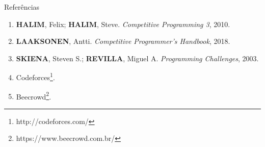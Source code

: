 \begin{frame}[fragile]{Referências}

    \begin{enumerate}
        \item \textbf{HALIM}, Felix; \textbf{HALIM}, Steve. \textit{Competitive Programming 3}, 2010.
        \item \textbf{LAAKSONEN}, Antti. \textit{Competitive Programmer's Handbook}, 2018.

        \item \textbf{SKIENA}, Steven S.; \textbf{REVILLA}, Miguel A. \textit{Programming
            Challenges}, 2003.

        \item Codeforces\footnote{http://codeforces.com/}.

        \item Beecrowd\footnote{https://www.beecrowd.com.br/}.
    \end{enumerate}

\end{frame}
